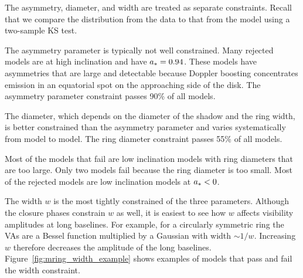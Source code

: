 The \mring asymmetry, diameter, and width are treated as separate constraints.
Recall that we compare the distribution from the data to that from the model using a two-sample KS test. %

The asymmetry parameter is typically not well constrained.
Many rejected models are at high inclination and have $a_* =0.94$.
These models have asymmetries that are large and detectable because Doppler boosting concentrates emission in an equatorial spot on the approaching side of the disk.
The asymmetry parameter constraint passes 90\% of all models.

The \mring diameter, which depends on the diameter of the shadow and the ring width, is better constrained than the asymmetry parameter and varies systematically from model to model.  %
The ring diameter constraint passes 55\% of all models.

Most of the models that fail are low inclination models with ring diameters that are too large. Only two \bhac models fail because the ring diameter is too small.  Most of the rejected models are low inclination models at $a_* < 0$.


The \mring width $w$ is the most tightly constrained of the three \mring parameters.
Although the closure phases constrain $w$ as well, it is easiest to see how $w$ affects visibility amplitudes at long baselines.
For example, for a circularly symmetric ring the VAs are a Bessel function multiplied by a Gaussian with width $\sim 1/w$.  Increasing $w$ therefore decreases the amplitude of the long baselines.
Figure~\ref{fig:mring_width_example} shows examples of models that pass and fail the \mring width constraint.

